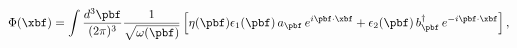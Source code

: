 \begin{equation}
\Phi ({\xbf}) = \int \frac{d^{3}{\pbf}}{(2\pi)^3} 
\frac{1}{\sqrt{ \omega(\pbf)}} \left[\eta(\pbf) \epsilon_1(\pbf) \, a_{\pbf} \,
e^{i{\pbf}\cdot{\xbf}}  
+ \epsilon_2(\pbf) \, b^{\dagger}_{\pbf} \, 
e^{- i{\pbf}\cdot{\xbf}}\right],
\label{Phi}
\end{equation}

